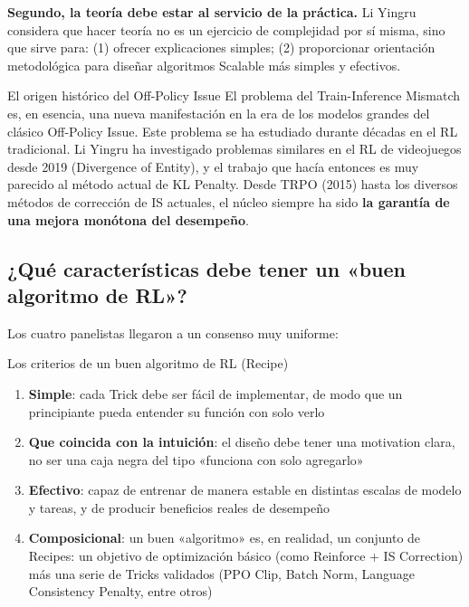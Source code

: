 \textbf{Segundo, la teoría debe estar al servicio de la práctica.} Li Yingru considera que hacer teoría no es un ejercicio de complejidad por sí misma, sino que sirve para: (1) ofrecer explicaciones simples; (2) proporcionar orientación metodológica para diseñar algoritmos Scalable más simples y efectivos.

\begin{knowledgebox}{El origen histórico del Off-Policy Issue}
El problema del Train-Inference Mismatch es, en esencia, una nueva manifestación en la era de los modelos grandes del clásico Off-Policy Issue. Este problema se ha estudiado durante décadas en el RL tradicional. Li Yingru ha investigado problemas similares en el RL de videojuegos desde 2019 (Divergence of Entity), y el trabajo que hacía entonces es muy parecido al método actual de KL Penalty. Desde TRPO (2015) hasta los diversos métodos de corrección de IS actuales, el núcleo siempre ha sido \textbf{la garantía de una mejora monótona del desempeño}.
\end{knowledgebox}

\subsection{¿Qué características debe tener un «buen algoritmo de RL»?}

Los cuatro panelistas llegaron a un consenso muy uniforme:

\begin{importantbox}{Los criterios de un buen algoritmo de RL (Recipe)}
\begin{enumerate}
    \item \textbf{Simple}: cada Trick debe ser fácil de implementar, de modo que un principiante pueda entender su función con solo verlo
    \item \textbf{Que coincida con la intuición}: el diseño debe tener una motivation clara, no ser una caja negra del tipo «funciona con solo agregarlo»
    \item \textbf{Efectivo}: capaz de entrenar de manera estable en distintas escalas de modelo y tareas, y de producir beneficios reales de desempeño
    \item \textbf{Composicional}: un buen «algoritmo» es, en realidad, un conjunto de Recipes: un objetivo de optimización básico (como Reinforce + IS Correction) más una serie de Tricks validados (PPO Clip, Batch Norm, Language Consistency Penalty, entre otros)
\end{enumerate}
\end{importantbox}

